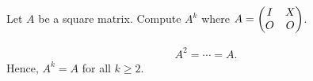 \documentclass[pdf,9pt]{beamer}
\begin{document}
\begin{frame}[fragile]
\begin{problem}
    Let $A$ be a square matrix.
    Compute $A^k$ where $A= \begin{pmatrix} I & X\cr O & O \end{pmatrix} $.
\end{problem}
\vfill
\begin{solution}
\begin{align*}
    A^2 = \cdots = A.
\end{align*}
Hence, $A^k=A$ for all $k\ge 2$.
\end{solution}
\end{frame}
\end{document}

